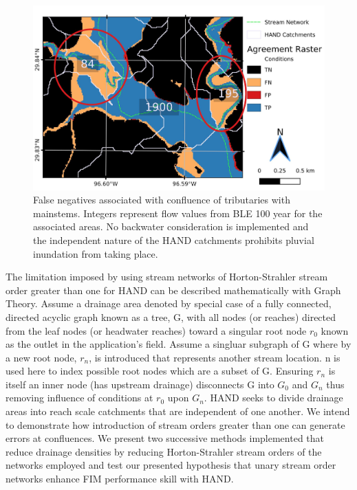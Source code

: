 \begin{figure}[h!]
\centering
\includegraphics[scale=1.0]{figures/catchment_boundaries_issue.jpg}
\caption{False negatives associated with confluence of tributaries with mainstems. Integers represent flow values from BLE 100 year for the associated areas. No backwater consideration is implemented and the independent nature of the HAND catchments prohibits pluvial inundation from taking place.}
\label{fig:catchment_boundaries_issue}
\end{figure}
%
The limitation imposed by using stream networks of Horton-Strahler stream order \cite{horton1945erosional,strahler1952hypsometric,strahler1952hypsometric} greater than one for HAND can be described mathematically with Graph Theory.
Assume a drainage area denoted by special case of a fully connected, directed acyclic graph known as a tree, G, with all nodes (or reaches) directed from the leaf nodes (or headwater reaches) toward a singular root node $r_0$ known as the outlet in the application's field.
Assume a singluar subgraph of G where by a new root node, $r_n$, is introduced that represents another stream location.
n is used here to index possible root nodes which are a subset of G.
Ensuring $r_n$ is itself an inner node (has upstream drainage) disconnects G into $G_0$ and $G_n$ thus removing influence of conditions at $r_0$ upon $G_n$.
HAND seeks to divide drainage areas into reach scale catchments that are independent of one another.
We intend to demonstrate how introduction of stream orders greater than one can generate errors at confluences.
We present two successive methods implemented that reduce drainage densities by reducing Horton-Strahler stream orders of the networks employed and test our presented hypothesis that unary stream order networks enhance FIM performance skill with HAND.
%
